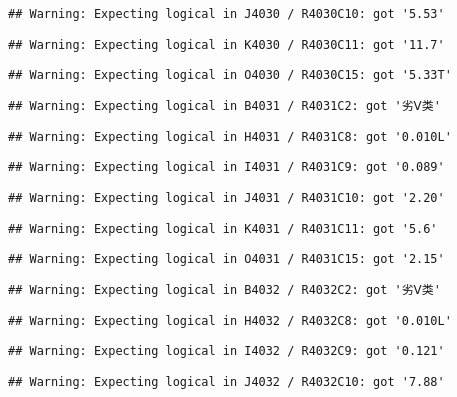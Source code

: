 \documentclass[
]{article}
\begin{document}
\begin{verbatim}
## Warning: Expecting logical in J4030 / R4030C10: got '5.53'
\end{verbatim}

\begin{verbatim}
## Warning: Expecting logical in K4030 / R4030C11: got '11.7'
\end{verbatim}

\begin{verbatim}
## Warning: Expecting logical in O4030 / R4030C15: got '5.33T'
\end{verbatim}

\begin{verbatim}
## Warning: Expecting logical in B4031 / R4031C2: got '劣Ⅴ类'
\end{verbatim}

\begin{verbatim}
## Warning: Expecting logical in H4031 / R4031C8: got '0.010L'
\end{verbatim}

\begin{verbatim}
## Warning: Expecting logical in I4031 / R4031C9: got '0.089'
\end{verbatim}

\begin{verbatim}
## Warning: Expecting logical in J4031 / R4031C10: got '2.20'
\end{verbatim}

\begin{verbatim}
## Warning: Expecting logical in K4031 / R4031C11: got '5.6'
\end{verbatim}

\begin{verbatim}
## Warning: Expecting logical in O4031 / R4031C15: got '2.15'
\end{verbatim}

\begin{verbatim}
## Warning: Expecting logical in B4032 / R4032C2: got '劣Ⅴ类'
\end{verbatim}

\begin{verbatim}
## Warning: Expecting logical in H4032 / R4032C8: got '0.010L'
\end{verbatim}

\begin{verbatim}
## Warning: Expecting logical in I4032 / R4032C9: got '0.121'
\end{verbatim}

\begin{verbatim}
## Warning: Expecting logical in J4032 / R4032C10: got '7.88'
\end{verbatim}
\end{document}
